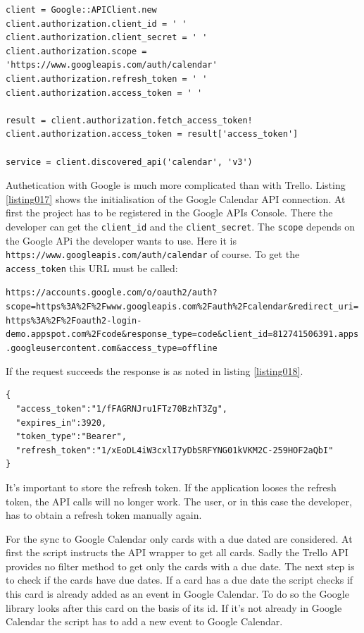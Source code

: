 \begin{lstlisting}[aboveskip=1\baselineskip, caption=Initialisation of the Google Calendar API connection., label=listing017]
client = Google::APIClient.new
client.authorization.client_id = ' '
client.authorization.client_secret = ' '
client.authorization.scope = 'https://www.googleapis.com/auth/calendar'
client.authorization.refresh_token = ' '
client.authorization.access_token = ' '

result = client.authorization.fetch_access_token!
client.authorization.access_token = result['access_token']

service = client.discovered_api('calendar', 'v3')
\end{lstlisting}

Authetication with Google is much more complicated than with Trello. Listing \ref{listing017} shows the initialisation of the Google Calendar API connection. At first the project has to be registered in the Google APIs Console. \cite{google:apisconsole} There the developer can get the \lstinline{client_id} and the \lstinline{client_secret}. The \lstinline{scope} depends on the Google APi the developer wants to use. Here it is \texttt{https://www.googleapis.com/auth/calendar} of course. \cite{google:apiscope} To get the \lstinline{access_token} this URL must be called: 
\begin{center}
\lstinline{https://accounts.google.com/o/oauth2/auth?scope=https%3A%2F%2Fwww.googleapis.com%2Fauth%2Fcalendar&redirect_uri=https%3A%2F%2Foauth2-login-demo.appspot.com%2Fcode&response_type=code&client_id=812741506391.apps.googleusercontent.com&access_type=offline}
\end{center}

If the request succeeds the response is as noted in listing \ref{listing018}.

\begin{lstlisting}[aboveskip=1\baselineskip, caption=Response of the token request., label=listing018]
{
  "access_token":"1/fFAGRNJru1FTz70BzhT3Zg",
  "expires_in":3920,
  "token_type":"Bearer",
  "refresh_token":"1/xEoDL4iW3cxlI7yDbSRFYNG01kVKM2C-259HOF2aQbI"
}
\end{lstlisting}

It's important to store the refresh token. If the application looses the refresh token, the API calls will no longer work. The user, or in this case the developer, has to obtain a refresh token manually again. \cite{google:calapi}

For the sync to Google Calendar only cards with a due dated are considered. At first the script instructs the API wrapper to get all cards. Sadly the Trello API provides no filter method to get only the cards with a due date. The next step is to check if the cards have due dates. If a card has a due date the script checks if this card is already added as an event in Google Calendar. To do so the Google library looks after this card on the basis of its id. If it's not already in Google Calendar the script has to add a new event to Google Calendar.

